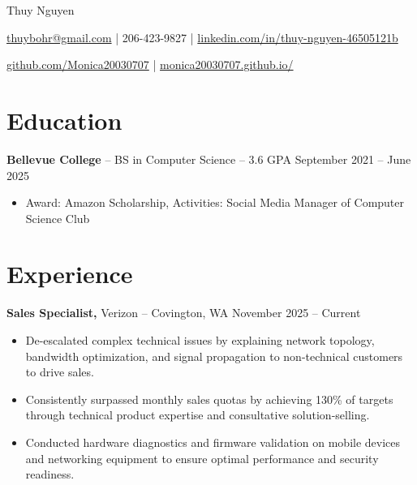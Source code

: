 \documentclass[11pt]{article}       %
\begin{document}
\centerline{\Huge Thuy Nguyen}

\vspace{5pt}

\centerline{\href{mailto:thuybohr@gmail.com}{thuybohr@gmail.com} | 206-423-9827 |
\href{https://www.linkedin.com/in/thuy-nguyen-46505121b/}{linkedin.com/in/thuy-nguyen-46505121b}}

\centerline{\href{https://github.com/Monica20030707}{github.com/Monica20030707} | 
\href{https://monica20030707.github.io/}{monica20030707.github.io/}} 

\vspace{-9pt}

\section*{Education}
\textbf{Bellevue College} -- BS in Computer Science -- 3.6 GPA \hfill September 2021 -- June 2025\\
\vspace{-9pt}
\begin{itemize}
  \item Award: Amazon Scholarship, Activities: Social Media Manager of Computer Science Club
\end{itemize}

\vspace{-18.5pt}

\section*{Experience}

\textbf{Sales Specialist,} {Verizon} -- Covington, WA \hfill November 2025 -- Current \\
\vspace{-9pt}
\begin{itemize}
  \item De-escalated complex technical issues by explaining network topology, bandwidth optimization, and signal propagation to non-technical customers to drive sales.
  \item Consistently surpassed monthly sales quotas by achieving 130\% of targets through technical product expertise and consultative solution-selling.
  \item Conducted hardware diagnostics and firmware validation on mobile devices and networking equipment to ensure optimal performance and security readiness.
\end{itemize}
\end{document}
